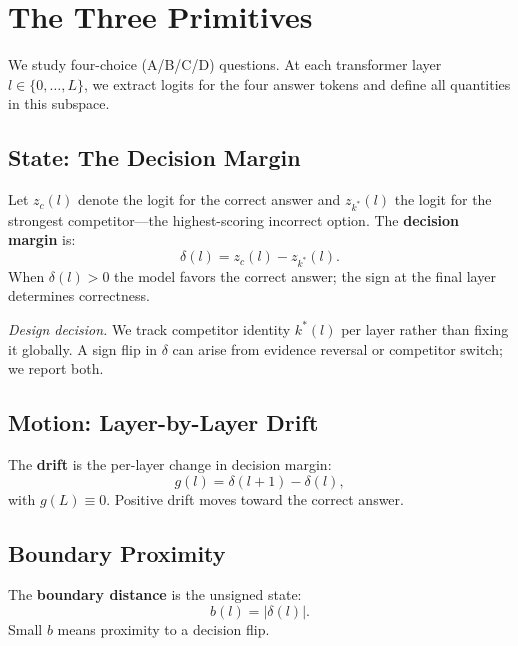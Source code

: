 \documentclass{article}
\begin{document}
\section{The Three Primitives}
\label{sec:primitives}

We study four-choice (A/B/C/D) questions.  At each transformer layer $l \in \{0,\ldots,L\}$, we extract logits for the four answer tokens and define all quantities in this subspace.

\subsection{State: The Decision Margin}

Let $z_c(l)$ denote the logit for the correct answer and $z_{k^*}(l)$ the logit for the strongest competitor---the highest-scoring incorrect option.  The \textbf{decision margin} is:
\begin{equation}
  \delta(l) = z_c(l) - z_{k^*}(l).
  \label{eq:delta}
\end{equation}
When $\delta(l) > 0$ the model favors the correct answer; the sign at the final layer determines correctness.

\emph{Design decision.}  We track competitor identity $k^*(l)$ per layer rather than fixing it globally.  A sign flip in $\delta$ can arise from evidence reversal or competitor switch; we report both.

\subsection{Motion: Layer-by-Layer Drift}

The \textbf{drift} is the per-layer change in decision margin:
\begin{equation}
  g(l) = \delta(l{+}1) - \delta(l),
  \label{eq:drift}
\end{equation}
with $g(L) \equiv 0$.  Positive drift moves toward the correct answer.

\subsection{Boundary Proximity}

The \textbf{boundary distance} is the unsigned state:
\begin{equation}
  b(l) = |\delta(l)|.
  \label{eq:boundary}
\end{equation}
Small $b$ means proximity to a decision flip.
\end{document}
